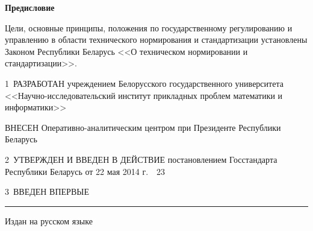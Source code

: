 \centerline{\bf Предисловие} 

Цели, основные принципы, положения по государственному регулированию и 
управлению в области технического нормирования и стандартизации 
установлены Законом Республики Беларусь <<О техническом нормировании и 
стандартизации>>.  

\vskip0.2cm

1~РАЗРАБОТАН учреждением Белорусского государственного университета 
<<Науч\-но-исследовательский  институт прикладных проблем математики и 
информатики>> 

ВНЕСЕН Оперативно-аналитическим центром при Президенте Республики Беларусь 

2~УТВЕРЖДЕН И ВВЕДЕН В ДЕЙСТВИЕ постановлением Госстандарта Республики 
Беларусь от 22 мая 2014 г.~\No~23

3~ВВЕДЕН ВПЕРВЫЕ

\vfill
\hrule
\vskip1mm
Издан на русском языке

\pagebreak
